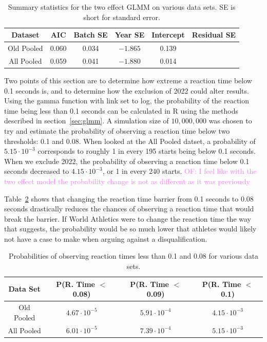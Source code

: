 \documentclass[12pt, letterpaper, titlepage]{article}
\newcommand{\of}[1]{\textcolor{violet}{OF: #1}}
\begin{document}
\begin{table}
  \centering
  \caption{Summary statistics for the two effect GLMM on various data sets. SE
  is short for standard error.} 
  \begin{tabular}{c c c c c c}
      \toprule
      Dataset & AIC & Batch SE & Year SE & Intercept & Residual SE \\
      \midrule
      Old Pooled & 0.060 & 0.034 & $-1.865$ & 0.139 \\
      All Pooled & 0.059 & 0.041 & $-1.880$ & 0.014 \\
      \bottomrule
  \end{tabular}
  \label{tab:Gamma_parameters}
\end{table}


Two points of this section are to determine how extreme a reaction time below
0.1 seconds is, and to determine how the exclusion of 2022 could alter results.
Using the gamma function with link set to log, the probability of the reaction 
time being less than 0.1 seconds can be calculated in R using the methods 
described in section~\ref{sec:glmm}. A simulation size of $10,000,000$ was 
chosen to try and estimate the probability of observing a reaction time below 
two thresholds: 0.1 and 0.08. When looked at the All Pooled datset, a probability
of $5.15\cdot10^{-3}$ corresponds to roughly 1 in every 195 starts
being below 0.1 seconds.  When we exclude 2022, the probability of observing a
reaction time below 0.1 seconds decreased to $4.15\cdot10^{-3}$, or 1 in every
240 starts.
\of{I feel like with the two effect model the probability change is not as
different as it was previously}


Table~\ref{tab:Sim_probability} shows that changing the reaction time 
barrier from 0.1 seconds to 0.08 seconds drastically reduces the chances of 
observing a reaction time that would break the barrier. If World Athletics were
to change the reaction time the way that \citet{komi2009iaaf} suggests, the 
probability would be so much lower that athletes would likely not
have a case to make when arguing against a disqualification.


\begin{table}
  \centering
  \caption{Probabilities of observing reaction times less than 0.1 and 0.08
  for various data sets.}
  \begin{tabular}{c c c c} 
   \toprule
   Data Set & P(R. Time $<$ 0.08) & P(R. Time $<$ 0.09) & P(R. Time $<$ 0.1)  \\ 
   \midrule
   Old Pooled & $4.67\cdot10^{-5}$ & $5.91\cdot10^{-4}$ &  $4.15\cdot10^{-3}$  \\ 
   All Pooled & $6.01\cdot10^{-5}$ & $7.39\cdot10^{-4}$ & $5.15\cdot10^{-3}$ \\
   \bottomrule
  \end{tabular}
  \label{tab:Sim_probability}
\end{table}
\end{document}
